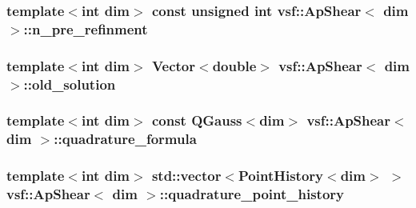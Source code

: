 \hypertarget{classvsf_1_1ApShear_a5c702ecbc19d28d835e666c8ee87c4eb}{
\subsubsection[{n\-\_\-pre\-\_\-refinment}]{\setlength{\rightskip}{0pt plus 5cm}template$<$int dim$>$ const unsigned int {\bf vsf\-::\-Ap\-Shear}$<$ dim $>$\-::n\-\_\-pre\-\_\-refinment\hspace{0.3cm}{\ttfamily [private]}}}\label{classvsf_1_1ApShear_a5c702ecbc19d28d835e666c8ee87c4eb}
\hypertarget{classvsf_1_1ApShear_a82d7592738e4d616740bb21a3aa1e394}{
\subsubsection[{old\-\_\-solution}]{\setlength{\rightskip}{0pt plus 5cm}template$<$int dim$>$ Vector$<$double$>$ {\bf vsf\-::\-Ap\-Shear}$<$ dim $>$\-::old\-\_\-solution\hspace{0.3cm}{\ttfamily [private]}}}\label{classvsf_1_1ApShear_a82d7592738e4d616740bb21a3aa1e394}
\hypertarget{classvsf_1_1ApShear_a2926794d4cbeed7550443a4999868110}{
\subsubsection[{quadrature\-\_\-formula}]{\setlength{\rightskip}{0pt plus 5cm}template$<$int dim$>$ const Q\-Gauss$<$dim$>$ {\bf vsf\-::\-Ap\-Shear}$<$ dim $>$\-::quadrature\-\_\-formula\hspace{0.3cm}{\ttfamily [private]}}}\label{classvsf_1_1ApShear_a2926794d4cbeed7550443a4999868110}
\hypertarget{classvsf_1_1ApShear_aeb702a26aef2b0a7d0d27d46909b81b9}{
\subsubsection[{quadrature\-\_\-point\-\_\-history}]{\setlength{\rightskip}{0pt plus 5cm}template$<$int dim$>$ std\-::vector$<${\bf Point\-History}$<$dim$>$ $>$ {\bf vsf\-::\-Ap\-Shear}$<$ dim $>$\-::quadrature\-\_\-point\-\_\-history\hspace{0.3cm}{\ttfamily [private]}}}\label{classvsf_1_1ApShear_aeb702a26aef2b0a7d0d27d46909b81b9}
